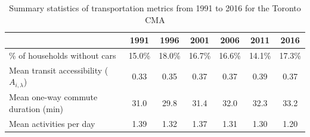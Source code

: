 \begin{table}[h]
	\small
	\centering
	\caption{{Summary statistics of transportation metrics from 1991 to 2016 for the Toronto CMA}}
	\label{table:tts}
	\begin{tabular}{lcccccc}
		\hline
		\textbf{}                          & \textbf{1991} & \textbf{1996} & \textbf{2001} & \textbf{2006} & \textbf{2011} & \textbf{2016} \\
		\hline
		
		
		\% of households without cars                            & 15.0\%  & 18.0\%  & 16.7\% & 16.6\%  & 14.1\%  & 17.3\%  \\
		Mean transit accessibility ($A_{i,\lambda}$) & 0.33 & 0.35 & 0.37 & 0.37 & 0.39 & 0.37 \\
		
		Mean one-way commute duration (min)                              & 31.0    & 29.8    & 31.4   & 32.0    & 32.3    & 33.2    \\
		Mean activities per day                                  & 1.39     & 1.32     & 1.37    & 1.31     & 1.30     & 1.20    \\ 
		\hline
	\end{tabular}
\end{table}

